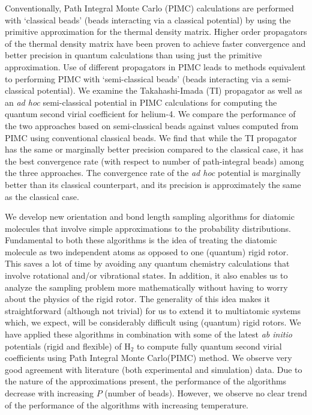 Conventionally, Path Integral Monte Carlo (PIMC) calculations are performed with `classical beads' (beads interacting via a classical potential) by using the primitive approximation for the thermal density matrix. Higher order propagators of the thermal density matrix have been proven to achieve faster convergence and better precision in quantum calculations than using just the primitive approximation. Use of different propagators in PIMC  leads to methods equivalent to performing PIMC with `semi-classical beads' (beads interacting via a semi-classical potential). We examine the Takahashi-Imada (TI) propagator as well as an \emph{ad hoc} semi-classical potential in PIMC calculations for computing the quantum second virial coefficient for helium-4. We compare the performance of the two approaches based on semi-classical beads against values computed from PIMC using conventional classical beads. We find that while the TI propagator has the same or marginally better precision compared to the classical case, it has the best convergence rate (with respect to number of path-integral beads) among the three approaches. The convergence rate of the \emph{ad hoc} potential is marginally better than its classical counterpart, and its precision is approximately the same as the classical case.

We develop new orientation and bond length sampling algorithms for diatomic molecules that involve simple approximations to the probability distributions. Fundamental to both these algorithms is the idea of treating the diatomic molecule as two independent atoms as opposed to one (quantum) rigid rotor. This saves a lot of time by avoiding any quantum chemistry calculations that involve rotational and/or vibrational states. In addition, it also enables us to analyze the sampling problem more mathematically without having to worry about the physics of the rigid rotor. The generality of this idea makes it straightforward (although not trivial) for us to extend it to multiatomic systems which, we expect, will be considerably difficult using (quantum) rigid rotors. We have applied these algorithms in combination with some of the latest \emph{ab initio} potentials (rigid and flexible) of H$_2$ to compute fully quantum second virial coefficients using Path Integral Monte Carlo(PIMC) method.  We observe very good agreement with literature (both experimental and simulation) data. Due to the nature of the approximations present, the performance of the algorithms decrease with increasing $P$ (number of beads). However, we observe no clear trend of the performance of the algorithms with increasing temperature.

